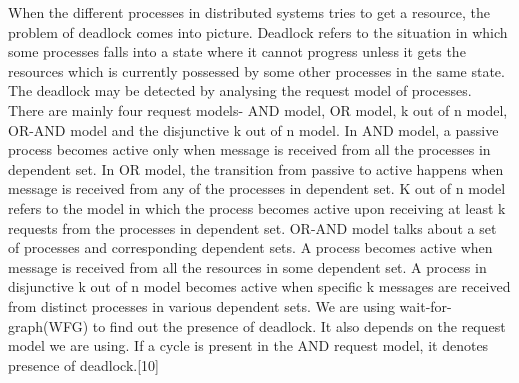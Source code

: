 \documentclass{article}[12pt,a4paper]
\begin{document}
	When the different processes in distributed systems tries to get a resource, the problem of deadlock comes into picture. Deadlock refers to the situation in which some processes falls into a state where it cannot progress unless it gets the resources which is currently possessed by some other processes in the same state. 
The deadlock may be detected by analysing the request model of processes. There are mainly four request models- AND model, OR model, k out of n model, OR-AND model and the disjunctive k out of n model. In AND model, a passive process becomes active only when message is received from all the processes in dependent set. In OR model, the transition from passive to active happens when message is received from any of the processes in dependent set. K out of n model refers to the model in which the process becomes active upon receiving at least k requests from the processes in dependent set. OR-AND model talks about a set of processes and corresponding dependent sets. A process becomes active when message is received from all the resources in some dependent set. A process in disjunctive k out of n model becomes active when specific k messages are received from distinct processes in various dependent sets. We are using wait-for-graph(WFG) to find out the presence of deadlock. It also depends on the request model we are using. If a cycle is present in the AND request model, it denotes presence of deadlock.[10]
\end{document}
